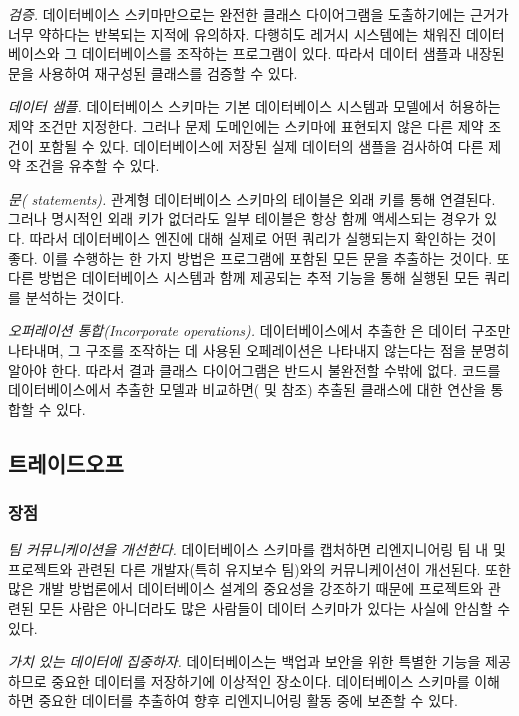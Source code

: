 \documentclass[a4paper,10pt,twoside]{book}
\begin{document}
\noindent
\emph{검증.}
데이터베이스 스키마만으로는 완전한 클래스 다이어그램을 도출하기에는 근거가 너무 약하다는 반복되는 지적에 유의하자. 다행히도 레거시 시스템에는 채워진 데이터베이스와 그 데이터베이스를 조작하는 프로그램이 있다. 따라서 데이터 샘플과 내장된  문을 사용하여 재구성된 클래스를 검증할 수 있다.

\begin{bulletlist}
\item \emph{데이터 샘플.}
데이터베이스 스키마는 기본 데이터베이스 시스템과 모델에서 허용하는 제약 조건만 지정한다. 그러나 문제 도메인에는 스키마에 표현되지 않은 다른 제약 조건이 포함될 수 있다. 데이터베이스에 저장된 실제 데이터의 샘플을 검사하여 다른 제약 조건을 유추할 수 있다.

\item \emph{ 문( statements).}
관계형 데이터베이스 스키마의 테이블은 외래 키를 통해 연결된다. 그러나 명시적인 외래 키가 없더라도 일부 테이블은 항상 함께 액세스되는 경우가 있다. 따라서 데이터베이스 엔진에 대해 실제로 어떤 쿼리가 실행되는지 확인하는 것이 좋다. 이를 수행하는 한 가지 방법은 프로그램에 포함된 모든  문을 추출하는 것이다. 또 다른 방법은 데이터베이스 시스템과 함께 제공되는 추적 기능을 통해 실행된 모든 쿼리를 분석하는 것이다.

\end{bulletlist}

\noindent
\emph{오퍼레이션 통합(Incorporate operations).}
데이터베이스에서 추출한 은 데이터 구조만 나타내며, 그 구조를 조작하는 데 사용된 오페레이션은 나타내지 않는다는 점을 분명히 알아야 한다. 따라서 결과 클래스 다이어그램은 반드시 불완전할 수밖에 없다. 코드를 데이터베이스에서 추출한 모델과 비교하면( 및  참조) 추출된 클래스에 대한 연산을 통합할 수 있다.

\subsection*{트레이드오프}

\subsubsection*{장점}

\begin{bulletlist}
\item \emph{팀 커뮤니케이션을 개선한다.} 데이터베이스 스키마를 캡처하면 리엔지니어링 팀 내 및 프로젝트와 관련된 다른 개발자(특히 유지보수 팀)와의 커뮤니케이션이 개선된다. 또한 많은 개발 방법론에서 데이터베이스 설계의 중요성을 강조하기 때문에 프로젝트와 관련된 모든 사람은 아니더라도 많은 사람들이 데이터 스키마가 있다는 사실에 안심할 수 있다.

\item \emph{가치 있는 데이터에 집중하자.} 데이터베이스는 백업과 보안을 위한 특별한 기능을 제공하므로 중요한 데이터를 저장하기에 이상적인 장소이다. 데이터베이스 스키마를 이해하면 중요한 데이터를 추출하여 향후 리엔지니어링 활동 중에 보존할 수 있다.
\end{bulletlist}
\end{document}
